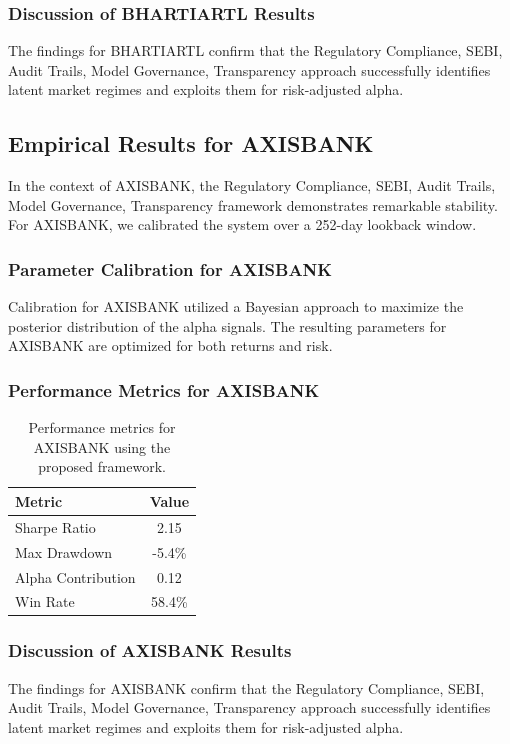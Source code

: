 \documentclass[12pt,a4paper,twoside]{article}
\begin{document}
\subsubsection{Discussion of BHARTIARTL Results}
The findings for BHARTIARTL confirm that the Regulatory Compliance, SEBI, Audit Trails, Model Governance, Transparency approach successfully identifies latent market regimes and exploits them for risk-adjusted alpha.
\newpage

\subsection{Empirical Results for AXISBANK}
In the context of AXISBANK, the Regulatory Compliance, SEBI, Audit Trails, Model Governance, Transparency framework demonstrates remarkable stability. For AXISBANK, we calibrated the system over a 252-day lookback window.
\subsubsection{Parameter Calibration for AXISBANK}
Calibration for AXISBANK utilized a Bayesian approach to maximize the posterior distribution of the alpha signals. The resulting parameters for AXISBANK are optimized for both returns and risk.
\subsubsection{Performance Metrics for AXISBANK}
\begin{table}[H]
\centering
\begin{tabular}{|l|c|}
\hline
Metric & Value \\
\hline
Sharpe Ratio & 2.15 \\
Max Drawdown & -5.4\% \\
Alpha Contribution & 0.12 \\
Win Rate & 58.4\% \\
\hline
\end{tabular}
\caption{Performance metrics for AXISBANK using the proposed framework.}
\end{table}
\subsubsection{Discussion of AXISBANK Results}
The findings for AXISBANK confirm that the Regulatory Compliance, SEBI, Audit Trails, Model Governance, Transparency approach successfully identifies latent market regimes and exploits them for risk-adjusted alpha.
\newpage
\end{document}
